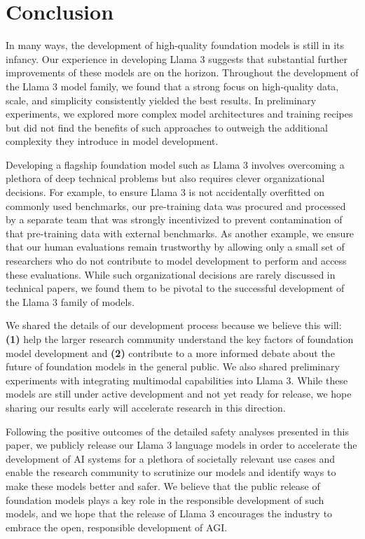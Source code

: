 \section{Conclusion}
\label{section:conclusion}
In many ways, the development of high-quality foundation models is still in its infancy.
Our experience in developing Llama 3 suggests that substantial further improvements of these models are on the horizon.
Throughout the development of the Llama 3 model family, we found that a strong focus on high-quality data, scale, and simplicity consistently yielded the best results.
In preliminary experiments, we explored more complex model architectures and training recipes but did not find the benefits of such approaches to outweigh the additional complexity they introduce in model development.

Developing a flagship foundation model such as Llama 3 involves overcoming a plethora of deep technical problems but also requires clever organizational decisions.
For example, to ensure Llama 3 is not accidentally overfitted on commonly used benchmarks, our pre-training data was procured and processed by a separate team that was strongly incentivized to prevent contamination of that pre-training data with external benchmarks. 
As another example, we ensure that our human evaluations remain trustworthy by allowing only a small set of researchers who do not contribute to model development to perform and access these evaluations.
While such organizational decisions are rarely discussed in technical papers, we found them to be pivotal to the successful development of the Llama 3 family of models.

We shared the details of our development process because we believe this will: \textbf{(1)} help the larger research community understand the key factors of foundation model development and \textbf{(2)} contribute to a more informed debate about the future of foundation models in the general public.
We also shared preliminary experiments with integrating multimodal capabilities into Llama 3.
While these models are still under active development and not yet ready for release, we hope sharing our results early will accelerate research in this direction.

Following the positive outcomes of the detailed safety analyses presented in this paper, we publicly release our Llama 3 language models in order to accelerate the development of AI systems for a plethora of societally relevant use cases and enable the research community to scrutinize our models and identify ways to make these models better and safer.
We believe that the public release of foundation models plays a key role in the responsible development of such models, and we hope that the release of Llama 3 encourages the industry to embrace the open, responsible development of AGI.
